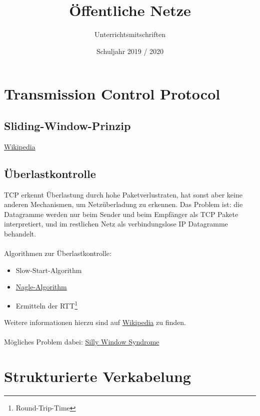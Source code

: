 \documentclass{scrartcl}
\title{Öffentliche Netze}
\subtitle{Unterrichtsmitschriften}
\date{Schuljahr 2019 / 2020}
\begin{document}
\maketitle
\tableofcontents

\section{Transmission Control Protocol}
\subsection{Sliding-Window-Prinzip}

\href{https://en.wikipedia.org/wiki/Sliding_window_protocol}{Wikipedia}

\subsection{Überlastkontrolle}

TCP erkennt Überlastung durch hohe Paketverlustraten, hat sonst aber keine anderen Mechanismen, um Netzüberladung zu erkennen.
Das Problem ist: die Datagramme werden nur beim Sender und beim Empfänger als TCP Pakete interpretiert, und im restlichen Netz als verbindungslose IP Datagramme behandelt.
\\\\
Algorithmen zur Überlastkontrolle:

\begin{itemize}
	\item Slow-Start-Algorithm
	\item \href{https://en.wikipedia.org/wiki/Nagle's_algorithm}{Nagle-Algorithm}
	\item Ermitteln der RTT\footnote{Round-Trip-Time}
\end{itemize}

\noindent
Weitere informationen hierzu sind auf \href{https://en.wikipedia.org/wiki/Sliding_window_protocol}{Wikipedia} zu finden.
\\\\
Mögliches Problem dabei: \href{https://en.wikipedia.org/wiki/Silly_window_syndrome}{Silly Window Syndrome}


\section{Strukturierte Verkabelung}
\end{document}
